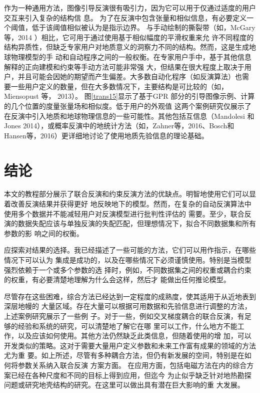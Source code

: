 作为一种通用方法，图像引导反演很有吸引力，因为它可以用于仅通过适度的用户交互来引入复杂的结构信 息。 为了在反演中包含张量和相似信息，有必要定义一个阈值，低于该阈值相似被认为是指示边界。 与手动绘制的撕裂带（如，McGary 等，2014 ）相比，它可用于通过使用基于相似幅度的平滑权重来允 许不同程度的结构异质性，但缺乏专家用户对地质意义的洞察力不同的结构。然而，这是生成地球物理模型的手 动和自动程序之间的一般权衡。在专家用户手中，基于其他信息解释的正向建模和约束等手动方法可能非常强 大，但结果在很大程度上取决于用户，并且可能会因她的期望而产生偏差。大多数自动化程序（如反演算法）也需 要一些用户定义的数量，但在大多数情况下，主要结构是可比较的（如，Miensopust 等， 2013）。 图\ref{trans15}显示了基于GPR 部分的引导图像示例、计算的几个位置的度量张量场和相似度。低于用户的外观值 这两个案例研究仅展示了在反演中引入地质和地球物理信息的一些可能性。其他包括互信息（Mandolesi 和 Jones 2014），或概率反演中的地统计方法（如，Zahner等，2016、Bosch和Hansen等，2016）更详细地讨论了使用地质先验信息的理论基础。

\section{结论}

本文的教程部分展示了联合反演和约束反演方法的优缺点。明智地使用它们可以显着改善反演结果并获得更好 地反映地下的模型。然而，在复杂的自动反演算法中使用多个数据并不能减轻用户对反演模型进行批判性评估的 需要。至少，联合反演的数据失配应该与单独反演的失配匹配，但理想情况下，拟合不同数据集和所有参数的影 响之间的权衡。

应探索对结果的选择。我已经描述了一些可能的方法，它们可以用作指示，在哪些情况下可以认为 集成是成功的，以及在哪些情况下必须谨慎使用。特别是当模型强烈依赖于一个或多个参数的选 择时，例如，不同数据集之间的权重或耦合约束的权重，有必要清楚地理解为什么会这样，然后才 能做出任何推论模型。

尽管存在这些困难，综合方法已经达到一定程度的成熟度，使其适用于从近地表到深层地幔的 大量区域。存在大量可以根据可用数据和先验信息进行调整的方法，上述案例研究展示了一些例 子。对于一些，例如交叉梯度耦合的联合反演，有足够的经验和系统的研究，可以清楚地了解它在哪 里可以工作，什么地方不能工作，以及应该如何使用。其他方法仍然缺乏此类信息，但随着使用的增 加，可以开发类似的策略。这对于需要大量用户定义参数和未来工作富有成果的领域的方法尤为重 要。如上所述，尽管有多种耦合方法，但仍有新发展的空间，特别是在如何将参数关系纳入联合反演 方案方面。 在应用方面，包括电磁方法在内的综合方案已经在各种尺度和不同的目标上得到应用，但迄今 为止似乎缺乏针对地热勘探问题或研究地壳结构的研究。在这里可以做出具有潜在巨大影响的重 大发展。
